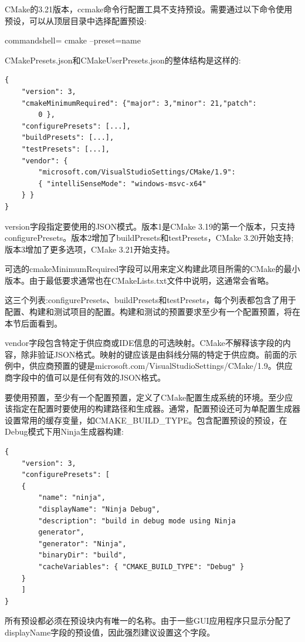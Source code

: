 CMake的3.21版本，ccmake命令行配置工具不支持预设。需要通过以下命令使用预设，可以从顶层目录中选择配置预设:

\begin{tcblisting}{commandshell={}}
cmake --preset=name
\end{tcblisting}

CMakePresets.json和CMakeUserPresets.json的整体结构是这样的:

\begin{lstlisting}[style=styleCMake]
{
	"version": 3,
	"cmakeMinimumRequired": {"major": 3,"minor": 21,"patch":
		0 },
	"configurePresets": [...],
	"buildPresets": [...],
	"testPresets": [...],
	"vendor": {
		"microsoft.com/VisualStudioSettings/CMake/1.9":
		{ "intelliSenseMode": "windows-msvc-x64"
	} }
}
\end{lstlisting}

version字段指定要使用的JSON模式。版本1是CMake 3.19的第一个版本，只支持configurePresets。版本2增加了buildPresets和testPresets，CMake 3.20开始支持;版本3增加了更多选项，CMake 3.21开始支持。

可选的cmakeMinimumRequired字段可以用来定义构建此项目所需的CMake的最小版本。由于最低要求通常也在CMakeLists.txt文件中说明，这通常会省略。

这三个列表:configurePresets、buildPresets和testPresets，每个列表都包含了用于配置、构建和测试项目的配置。构建和测试的预置要求至少有一个配置预置，将在本节后面看到。

vendor字段包含特定于供应商或IDE信息的可选映射。CMake不解释该字段的内容，除非验证JSON格式。映射的键应该是由斜线分隔的特定于供应商。前面的示例中，供应商预置的键是microsoft.com/VisualStudioSettings/CMake/1.9。供应商字段中的值可以是任何有效的JSON格式。

要使用预置，至少有一个配置预置，定义了CMake配置生成系统的环境。至少应该指定在配置时要使用的构建路径和生成器。通常，配置预设还可为单配置生成器设置常用的缓存变量，如CMAKE\_BUILD\_TYPE。包含配置预设的预设，在Debug模式下用Ninja生成器构建:

\begin{lstlisting}[style=styleCMake]
{
	"version": 3,
	"configurePresets": [
	{
		"name": "ninja",
		"displayName": "Ninja Debug",
		"description": "build in debug mode using Ninja
		generator",
		"generator": "Ninja",
		"binaryDir": "build",
		"cacheVariables": { "CMAKE_BUILD_TYPE": "Debug" }
	}
	]
}
\end{lstlisting}

所有预设都必须在预设块内有唯一的名称。由于一些GUI应用程序只显示分配了displayName字段的预设值，因此强烈建议设置这个字段。

